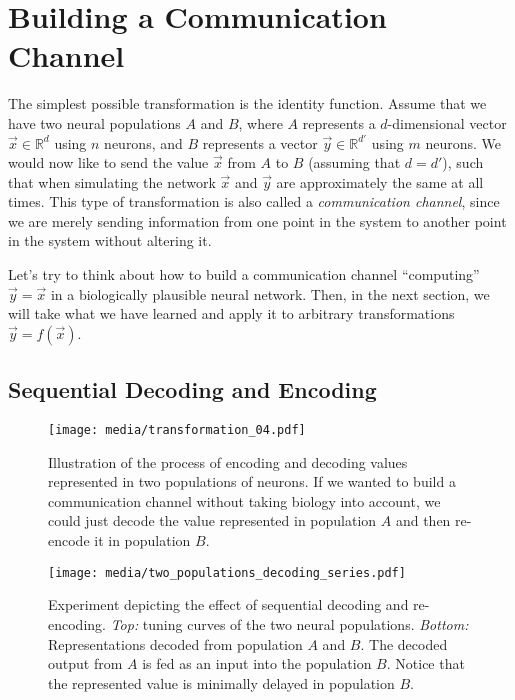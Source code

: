 \documentclass[10pt,letterpaper,oneside]{article}
\begin{document}
	\section{Building a Communication Channel}
	
	The simplest possible transformation is the identity function. Assume that we have two neural populations $A$ and $B$, where $A$ represents a $d$-dimensional vector $\vec x \in \mathbb{R}^{d}$ using $n$ neurons, and $B$ represents a vector $\vec y \in \mathbb{R}^{d'}$ using $m$ neurons. We would now like to send the value $\vec x$ from $A$ to $B$ (assuming that $d = d'$), such that when simulating the network $\vec x$ and $\vec y$ are approximately the same at all times. This type of transformation is also called a \emph{communication channel}, since we are merely sending information from one point in the system to another point in the system without altering it.

	Let's try to think about how to build a communication channel \enquote{computing} $\vec y = \vec x$ in a biologically plausible neural network. Then, in the next section, we will take what we have learned and apply it to arbitrary transformations $\vec y = f(\vec x)$.
	
	\subsection{Sequential Decoding and Encoding}
	
	\begin{figure}[p]
		\texttt{[image: media/transformation\_04.pdf]}
		\caption{Illustration of the process of encoding and decoding values represented in two populations of neurons. If we wanted to build a communication channel without taking biology into account, we could just decode the value represented in population $A$ and then re-encode it in population $B$.}
		\label{fig:transformation_04}
	\end{figure}
	
	\begin{figure}[p]
		\texttt{[image: media/two\_populations\_decoding\_series.pdf]}
		\caption{Experiment depicting the effect of sequential decoding and re-encoding. \emph{Top:} tuning curves of the two neural populations. \emph{Bottom:} Representations decoded from population $A$ and $B$. The decoded output from $A$ is fed as an input into the population $B$.  Notice that the represented value is minimally delayed in population $B$.}
		\label{fig:two_populations_decoding_series}
	\end{figure}
	
\end{document}
